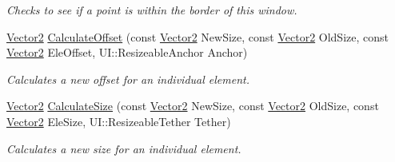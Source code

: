 \begin{DoxyCompactItemize}
\begin{DoxyCompactList}\small\item\em Checks to see if a point is within the border of this window. \item\end{DoxyCompactList}\item 
\hypertarget{classphys_1_1UI_1_1Window_ae733d9dc3b0bc37c91dc7002c8b01bc7}{
\hyperlink{classphys_1_1Vector2}{Vector2} \hyperlink{classphys_1_1UI_1_1Window_ae733d9dc3b0bc37c91dc7002c8b01bc7}{CalculateOffset} (const \hyperlink{classphys_1_1Vector2}{Vector2} NewSize, const \hyperlink{classphys_1_1Vector2}{Vector2} OldSize, const \hyperlink{classphys_1_1Vector2}{Vector2} EleOffset, UI::ResizeableAnchor Anchor)}
\label{classphys_1_1UI_1_1Window_ae733d9dc3b0bc37c91dc7002c8b01bc7}

\begin{DoxyCompactList}\small\item\em Calculates a new offset for an individual element. \item\end{DoxyCompactList}\item 
\hypertarget{classphys_1_1UI_1_1Window_a4d120ac244f9a9c683f8b9bdb90835a8}{
\hyperlink{classphys_1_1Vector2}{Vector2} \hyperlink{classphys_1_1UI_1_1Window_a4d120ac244f9a9c683f8b9bdb90835a8}{CalculateSize} (const \hyperlink{classphys_1_1Vector2}{Vector2} NewSize, const \hyperlink{classphys_1_1Vector2}{Vector2} OldSize, const \hyperlink{classphys_1_1Vector2}{Vector2} EleSize, UI::ResizeableTether Tether)}
\label{classphys_1_1UI_1_1Window_a4d120ac244f9a9c683f8b9bdb90835a8}

\begin{DoxyCompactList}\small\item\em Calculates a new size for an individual element. \item\end{DoxyCompactList}\end{DoxyCompactItemize}

